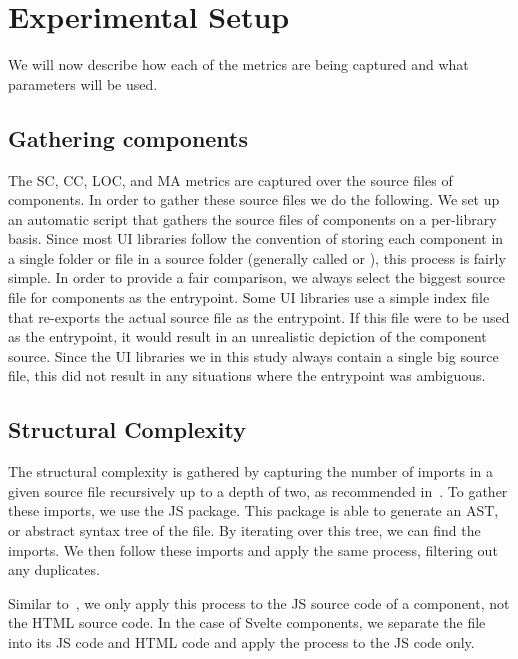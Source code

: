 \chapter{Experimental Setup}\label{chap:experimental-setup}
We will now describe how each of the metrics are being captured and what parameters will be used.

\section{Gathering components}\label{sec:experimental-setup:gathering-components}
The SC, CC, LOC, and MA metrics are captured over the source files of components. In order to gather these source files we do the following. We set up an automatic script that gathers the source files of components on a per-library basis. Since most UI libraries follow the convention of storing each component in a single folder or file in a source folder (generally called  or ), this process is fairly simple. In order to provide a fair comparison, we always select the biggest source file for components as the entrypoint. Some UI libraries use a simple index file that re-exports the actual source file as the entrypoint. If this file were to be used as the entrypoint, it would result in an unrealistic depiction of the component source. Since the UI libraries we in this study always contain a single big source file, this did not result in any situations where the entrypoint was ambiguous.

\section{Structural Complexity}
The structural complexity is gathered by capturing the number of imports in a given source file recursively up to a depth of two, as recommended in~\cite{martinez-ortiz2016quality}. To gather these imports, we use the  JS package. This package is able to generate an AST, or abstract syntax tree of the file. By iterating over this tree, we can find the imports. We then follow these imports and apply the same process, filtering out any duplicates.

Similar to~\cite{martinez-ortiz2016quality}, we only apply this process to the JS source code of a component, not the HTML source code. In the case of Svelte components, we separate the file into its JS code and HTML code and apply the process to the JS code only.

